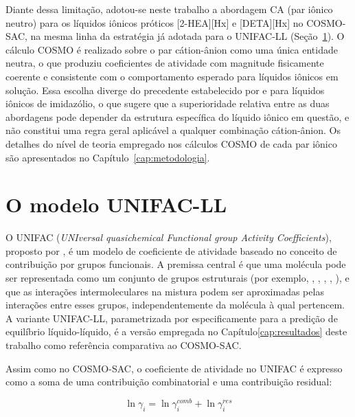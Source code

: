 Diante dessa limitação, adotou-se neste trabalho a abordagem CA (par iônico neutro) para os líquidos iônicos próticos [2-HEA][Hx] e [DETA][Hx] no COSMO-SAC, na mesma linha da estratégia já adotada para o UNIFAC-LL (Seção~\ref{sec:unifacll}). O cálculo COSMO é realizado sobre o par cátion-ânion como uma única entidade neutra, o que produziu coeficientes de atividade com magnitude fisicamente coerente e consistente com o comportamento esperado para líquidos iônicos em solução. Essa escolha diverge do precedente estabelecido por  e  para líquidos iônicos de imidazólio, o que sugere que a superioridade relativa entre as duas abordagens pode depender da estrutura específica do líquido iônico em questão, e não constitui uma regra geral aplicável a qualquer combinação cátion-ânion. Os detalhes do nível de teoria empregado nos cálculos COSMO de cada par iônico são apresentados no Capítulo~\ref{cap:metodologia}.

\section{O modelo UNIFAC-LL}
\label{sec:unifacll}

O UNIFAC (\textit{UNIversal quasichemical Functional group Activity Coefficients}), proposto por , é um modelo de coeficiente de atividade baseado no conceito de contribuição por grupos funcionais. A premissa central é que uma molécula pode ser representada como um conjunto de grupos estruturais (por exemplo, , , , , ), e que as interações intermoleculares na mistura podem ser aproximadas pelas interações entre esses grupos, independentemente da molécula à qual pertencem\cite{fredenslund1975}. A variante UNIFAC-LL, parametrizada por  especificamente para a predição de equilíbrio líquido-líquido, é a versão empregada no Capítulo\ref{cap:resultados} deste trabalho como referência comparativa ao COSMO-SAC.


Assim como no COSMO-SAC, o coeficiente de atividade no UNIFAC é expresso como a soma de uma contribuição combinatorial e uma contribuição residual\cite{fredenslund1975}:

\begin{equation}
    \ln \gamma_i = \ln \gamma_i^{comb} + \ln \gamma_i^{res}
    \label{eq:gamma_unifac}
\end{equation}

